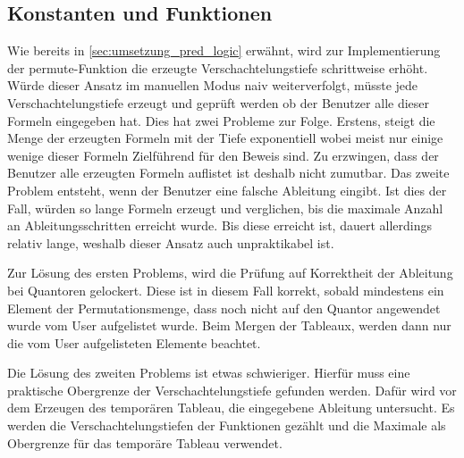 \subsection{Konstanten und Funktionen}
Wie bereits in \autoref{sec:umsetzung_pred_logic} erwähnt, wird zur Implementierung der permute-Funktion die erzeugte Verschachtelungstiefe schrittweise erhöht. Würde dieser Ansatz im manuellen Modus naiv weiterverfolgt, müsste jede Verschachtelungstiefe erzeugt und geprüft werden ob der Benutzer alle dieser Formeln eingegeben hat. Dies hat zwei Probleme zur Folge. Erstens, steigt die Menge der erzeugten Formeln mit der Tiefe exponentiell wobei meist nur einige wenige dieser Formeln Zielführend für den Beweis sind. Zu erzwingen, dass der Benutzer alle erzeugten Formeln auflistet ist deshalb nicht zumutbar. Das zweite Problem entsteht, wenn der Benutzer eine falsche Ableitung eingibt. Ist dies der Fall, würden so lange Formeln erzeugt und verglichen, bis die maximale Anzahl an Ableitungsschritten erreicht wurde. Bis diese erreicht ist, dauert allerdings relativ lange, weshalb dieser Ansatz auch unpraktikabel ist.

Zur Lösung des ersten Problems, wird die Prüfung auf Korrektheit der Ableitung bei Quantoren gelockert. Diese ist in diesem Fall korrekt, sobald mindestens ein Element der Permutationsmenge, dass noch nicht auf den Quantor angewendet wurde vom User aufgelistet wurde. Beim Mergen der Tableaux, werden dann nur die vom User aufgelisteten Elemente beachtet.

Die Lösung des zweiten Problems ist etwas schwieriger. Hierfür muss eine praktische Obergrenze der Verschachtelungstiefe gefunden werden. Dafür wird vor dem Erzeugen des temporären Tableau, die eingegebene Ableitung untersucht. Es werden die Verschachtelungstiefen der Funktionen gezählt und die Maximale als Obergrenze für das temporäre Tableau verwendet.





